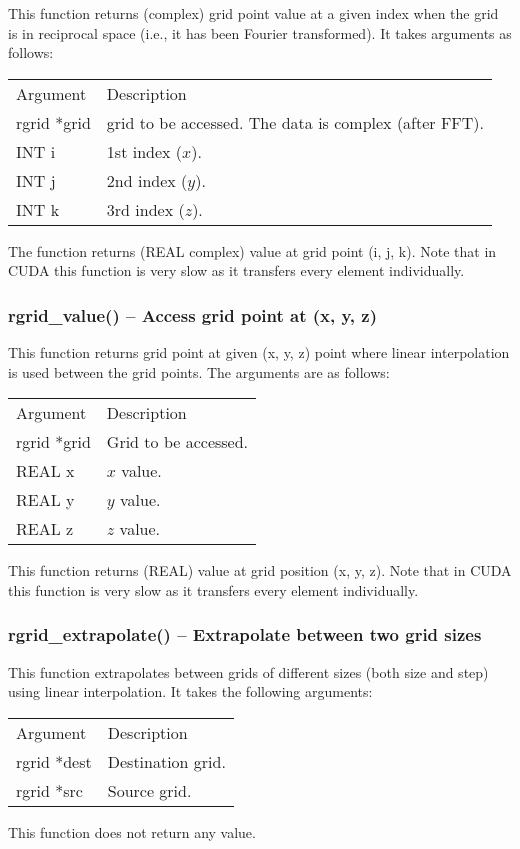 \documentclass[12pt,letterpaper]{article}
\begin{document}
This function returns (complex) grid point value at a given index when the grid is in reciprocal space (i.e., it has been Fourier transformed). It takes arguments as follows:
\begin{longtable}{p{} p{}}
Argument & Description\\
\cline{1-2}
rgrid *grid & grid to be accessed. The data is complex (after FFT).\\
INT i & 1st index ($x$).\\
INT j & 2nd index ($y$).\\
INT k & 3rd index ($z$).\\
\end{longtable}
\noindent
The function returns (REAL complex) value at grid point (i, j, k). Note that in CUDA this function is very slow as it transfers every element individually.

\subsubsection{rgrid\_value() -- Access grid point at (x, y, z)}

This function returns grid point at given (x, y, z) point where linear interpolation is used between the grid points. The arguments are as follows:
\begin{longtable}{p{} p{}}
Argument & Description\\
\cline{1-2}
rgrid *grid & Grid to be accessed.\\
REAL x & $x$ value.\\
REAL y & $y$ value.\\
REAL z & $z$ value.\\
\end{longtable}
\noindent
This function returns (REAL) value at grid position (x, y, z). Note that in CUDA this function is very slow as it transfers every element individually.

\subsubsection{rgrid\_extrapolate() -- Extrapolate between two grid sizes}

This function extrapolates between grids of different sizes (both size and step) using linear interpolation. It takes the following arguments:
\begin{longtable}{p{} p{}}
Argument & Description\\
\cline{1-2}
rgrid *dest & Destination grid.\\
rgrid *src  & Source grid.\\
\end{longtable}
\noindent
This function does not return any value. 
\end{document}

